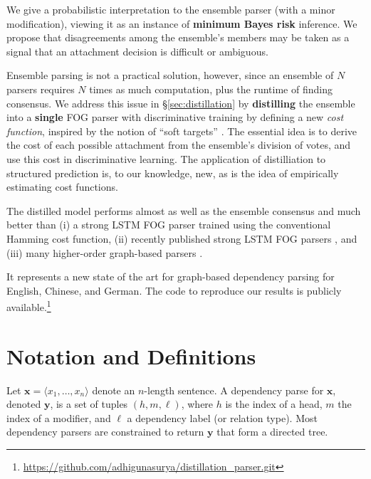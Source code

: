 \documentclass[11pt,letterpaper]{article}
\newcommand{\ignore}[1]{}
\newcommand{\adhicomment}[1]{\ignore{\textcolor{green}{{\textbf{[#1 --\textsc{adhi}]}}}}}
\newcommand{\nascomment}[1]{\ignore{\textcolor{blue}{{\textbf{[#1 --\textsc{nas}]}}}}}
\begin{document}
We give a probabilistic interpretation to the ensemble parser (with a minor modification), viewing it as an instance of \textbf{minimum Bayes risk} inference.  We propose that disagreements among the ensemble's members may be taken as a signal that an attachment decision is difficult or ambiguous.

Ensemble parsing is not a practical solution, however, since an ensemble of $N$ parsers requires $N$ times as much computation, plus the runtime of finding consensus.  We address this issue in \S\ref{sec:distillation} by \textbf{distilling} the ensemble into a \textbf{single} FOG parser with discriminative training by defining a new \emph{cost function},
inspired by the notion of ``soft targets'' \cite{dark_knowledge}.  The essential idea is to derive the cost of each possible attachment from the ensemble's division of votes, and use this cost in discriminative learning.
The application of distilliation to structured prediction is, to our knowledge, new, as is the idea of empirically estimating cost functions.

The distilled model performs almost as well as the ensemble consensus and much better than (i)  a strong LSTM FOG parser trained using the conventional Hamming cost function, (ii) recently published strong LSTM FOG parsers \cite{kiperwasser,graph_based_segment}, and (iii) many higher-order graph-based parsers \cite{third_order,turbo_parser,le_zuidema}.
\adhicomment{Added a citation to the recent graph-based LSTM ACL 2016 paper}
\nascomment{collapsed to go with Kiperwasser}  It represents a new state of the art for graph-based dependency parsing for English, Chinese, and German. 
The code to reproduce our results is publicly available.\footnote{\url{https://github.com/adhigunasurya/distillation_parser.git}} 
















\section{Notation and Definitions}


Let $\boldsymbol{x} = \langle x_1, \ldots, x_n\rangle$ denote an $n$-length sentence.  A dependency parse
for $\boldsymbol{x}$, denoted $\boldsymbol{y}$, is a set of tuples $(h, m, \ell)$, where $h$ is the index of a head, $m$ the index of a modifier, and $\ell$ a dependency label (or relation type).  Most dependency parsers are constrained to return $\boldsymbol{y}$ that form a directed tree.  
\end{document}
